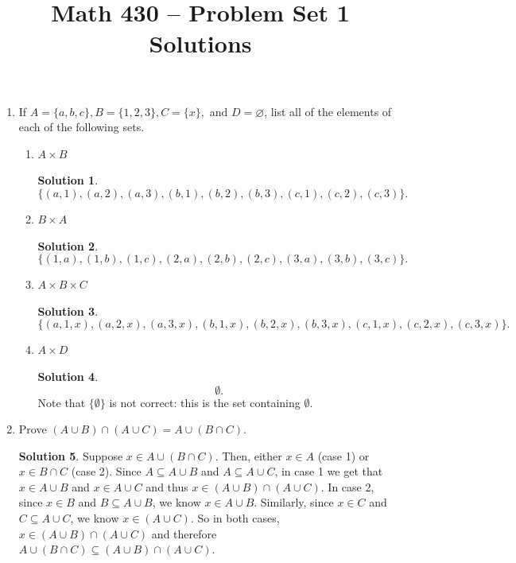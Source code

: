 \documentclass{article}
\title{Math 430 -- Problem Set 1 Solutions}
\date{}
\theoremstyle{definition}
\newtheorem*{solution}{Solution}
\begin{document}
\maketitle

\begin{enumerate}
\item[1.2.] If $A = \{a,b,c\}, B = \{1,2,3\}, C = \{x\},$ and $D = \varnothing$, list all of the elements of each of the following sets.
\begin{enumerate}
\item $A \times B$
\begin{solution}
$$\{(a,1),(a,2),(a,3),(b,1),(b,2),(b,3),(c,1),(c,2),(c,3)\}.$$
\end{solution}
\item $B \times A$
\begin{solution}
$$\{(1,a),(1,b),(1,c),(2,a),(2,b),(2,c),(3,a),(3,b),(3,c)\}.$$
\end{solution}
\item $A \times B \times C$
\begin{solution}
$$\{(a,1,x),(a,2,x),(a,3,x),(b,1,x),(b,2,x),(b,3,x),(c,1,x),(c,2,x),(c,3,x)\}.$$
\end{solution}
\item $A \times D$
\begin{solution}
$$\emptyset.$$
Note that $\{\emptyset\}$ is not correct: this is the set containing $\emptyset$.
\end{solution}
\end{enumerate}
\item[1.6.] Prove $(A \cup B) \cap (A \cup C) = A \cup (B \cap C)$.
\begin{solution}
Suppose $x \in A \cup (B \cap C)$.  Then, either $x \in A$ (case 1) or $x \in B \cap C$ (case 2).  Since $A \subseteq A \cup B$ and $A \subseteq A \cup C$, in case 1 we get that $x \in A \cup B$ and $x \in A \cup C$ and thus $x \in (A \cup B) \cap (A \cup C)$.  In case 2, since $x \in B$ and $B \subseteq A \cup B$, we know $x \in A \cup B$.  Similarly, since $x \in C$ and $C \subseteq A \cup C$, we know $x \in (A \cup C)$.  So in both cases, $x \in (A \cup B) \cap (A \cup C)$ and therefore $A \cup (B \cap C) \subseteq (A \cup B) \cap (A \cup C)$.


\end{solution}
\end{enumerate}
\end{document}
